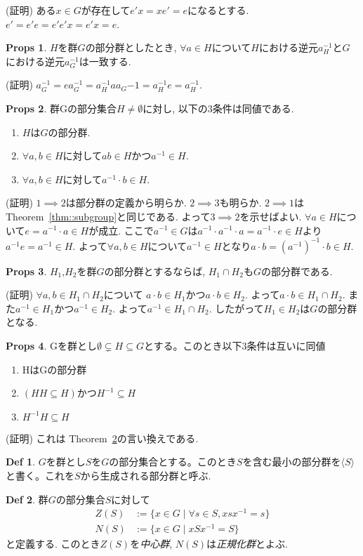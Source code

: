 \documentclass[dvipdfmx]{jsarticle}
\theoremstyle{definition}
\newtheorem{props}{Props}
\newtheorem{definition}{Def}
\numberwithin{equation}{section}
\numberwithin{props}{section}
\numberwithin{definition}{section}
\numberwithin{note}{section}
\begin{document}
(証明) ある$x\in G$が存在して$e'x=xe'=e$になるとする. $e'=e'e=e'e'x=e'x=e$.
\begin{props}
     $H$を群$G$の部分群としたとき, $\forall a\in H$について$H$における逆元$a_H^{-1}$と$G$における逆元$a_G^{-1}$は一致する.
\end{props}
(証明) $a_G^{-1}=ea_G^{-1}=a_H^{-1}aa_G{-1}=a_H^{-1}e=a_H^{-1}$.
\begin{props}\label{them::subgroup3}
     群Gの部分集合$H\neq \emptyset$に対し, 以下の3条件は同値である.
     \begin{enumerate}
          \item $H$は$G$の部分群.
          \item $\forall a,b \in H$に対して$ab\in H$かつ$ a^{-1}\in H$.
          \item $\forall a,b \in H$に対して$a^{-1}\cdot b\in H$.
     \end{enumerate}
\end{props}
(証明) $1\implies 2$は部分群の定義から明らか. $2\implies 3$も明らか.
$2\implies 1$は Theorem~\ref{thm::subgroup}と同じである.
よって$3\implies 2$を示せばよい.
$\forall a\in H$について$e=a^{-1}\cdot a\in H$が成立. ここで$a^{-1}\in G$は$a^{-1}\cdot a^{-1}\cdot a=a^{-1}\cdot e \in H$より$a^{-1}e=a^{-1}\in H$.
よって$\forall a,b \in H$について$a^{-1}\in H$となり$a\cdot b=(a^{-1})^{-1}\cdot b\in H$.
\begin{props}
     $H_1$,$H_2$を群$G$の部分群とするならば, $H_1\cap H_2$も$G$の部分群である.
\end{props}
(証明) $\forall a,b\in H_1\cap H_2$について $a\cdot b\in H_1$かつ$a\cdot b\in H_2$. よって$a\cdot b\in H_1\cap H_2$.
また$a^{-1}\in H_1$かつ$a^{-1}\in H_2$. よって$a^{-1}\in H_1\cap H_2$. したがって$H_1\in H_2$は$G$の部分群となる.
\begin{props}
     Gを群とし$\emptyset \subsetneq H\subseteq G$とする。このとき以下3条件は互いに同値
     \begin{enumerate}
          \item HはGの部分群
          \item $(HH\subseteq H)$かつ$H^{-1}\subseteq H$
          \item $H^{-1}H\subseteq H$
     \end{enumerate}
\end{props}
(証明) これは Theorem~\ref{them::subgroup3}の言い換えである.
\begin{definition}
     $G$を群とし$S$を$G$の部分集合とする。このとき$S$を含む最小の部分群を$\langle S \rangle$と書く。これを$S$から生成される部分群と呼ぶ.
\end{definition}
\begin{definition}
     群$G$の部分集合$S$に対して
     \begin{align}
          Z(S) & :=\lbrace x\in G\mid \forall s\in S, xsx^{-1}=s\rbrace \\
          N(S) & :=\lbrace x\in G \mid  xSx^{-1}=S\rbrace
     \end{align}
     と定義する. このとき$Z(S)$を\emph{中心群}, $N(S)$は\emph{正規化群}とよぶ.
\end{definition}
\end{document}
